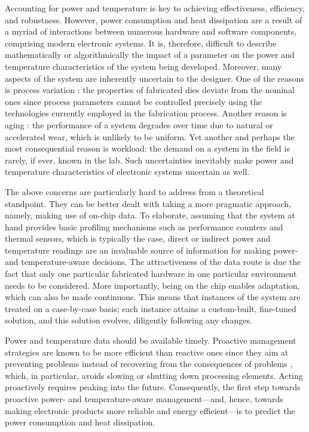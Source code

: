 Accounting for power and temperature is key to achieving effectiveness,
efficiency, and robustness. However, power consumption and heat dissipation are
a result of a myriad of interactions between numerous hardware and software
components, comprising modern electronic systems. It is, therefore, difficult to
describe mathematically or algorithmically the impact of a parameter on the
power and temperature characteristics of the system being developed. Moreover,
many aspects of the system are inherently uncertain to the designer. One of the
reasons is process variation \cite{chandrakasan2000}: the properties of
fabricated dies deviate from the nominal ones since process parameters cannot be
controlled precisely using the technologies currently employed in the
fabrication process. Another reason is aging \cite{coskun2006}: the performance
of a system degrades over time due to natural or accelerated wear, which is
unlikely to be uniform. Yet another and perhaps the most consequential reason is
workload: the demand on a system in the field is rarely, if ever, known in the
lab. Such uncertainties inevitably make power and temperature characteristics of
electronic systems uncertain as well.

The above concerns are particularly hard to address from a theoretical
standpoint. They can be better dealt with taking a more pragmatic approach,
namely, making use of on-chip data. To elaborate, assuming that the system at
hand provides basic profiling mechanisms such as performance counters and
thermal sensors, which is typically the case, direct or indirect power and
temperature readings are an invaluable source of information for making power-
and temperature-aware decisions. The attractiveness of the data route is due the
fact that only one particular fabricated hardware in one particular environment
needs to be considered. More importantly, being on the chip enables adaptation,
which can also be made continuous. This means that instances of the system are
treated on a case-by-case basis; each instance attains a custom-built,
fine-tuned solution, and this solution evolves, diligently following any
changes.

Power and temperature data should be available timely. Proactive management
strategies are known to be more efficient than reactive ones since they aim at
preventing problems instead of recovering from the consequences of problems
\cite{coskun2008, chaudhry2015}, which, in particular, avoids slowing or
shutting down processing elements. Acting proactively requires peaking into the
future. Consequently, the first step towards proactive power- and
temperature-aware management---and, hence, towards making electronic products
more reliable and energy efficient---is to predict the power consumption and
heat dissipation.

